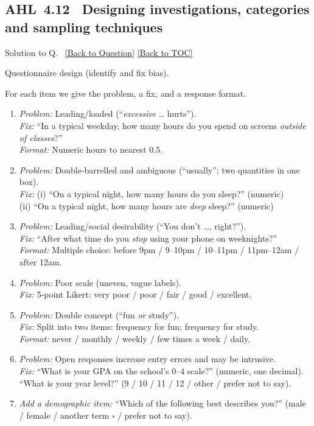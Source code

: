 \documentclass[11pt]{article}
\def\textbf#1{#1}%
\newcommand{\tocsubsection}[1]{\subsection{#1}}
\newcounter{question}
\newcounter{solutionNo} %
\newenvironment{solution}{
  \refstepcounter{solutionNo}%
  \hypertarget{sol-\thesolutionNo}{}%
  \par\noindent\textbf{Solution to Q\thesolutionNo.}~%
  \hyperlink{q-\thesolutionNo}{\small[Back to Question]}%
  \quad\hyperlink{toc}{\small[Back to TOC]}%
  \par\vspace{0.3em}%
}{\par}
\begin{document}

\tocsubsection{AHL 4.12 \; Designing investigations, categories and sampling techniques}


\begin{solution}
\textbf{Questionnaire design (identify and fix bias).}

For each item we give the problem, a fix, and a response format.

\begin{enumerate}
  \item \emph{Problem:} Leading/loaded (“\emph{excessive} … hurts”). \\
        \emph{Fix:} “In a typical weekday, how many hours do you spend on screens \emph{outside of classes}?” \\
        \emph{Format:} Numeric hours to nearest $0.5$.

  \item \emph{Problem:} Double‐barrelled and ambiguous (“usually”; two quantities in one box). \\
        \emph{Fix:} (i) “On a typical night, how many hours do you sleep?” (numeric) \\
        (ii) “On a typical night, how many hours are \emph{deep} sleep?” (numeric)

  \item \emph{Problem:} Leading/social desirability (“You don’t …, right?”). \\
        \emph{Fix:} “After what time do you \emph{stop} using your phone on weeknights?” \\
        \emph{Format:} Multiple choice: before 9pm / 9–10pm / 10–11pm / 11pm–12am / after 12am.

  \item \emph{Problem:} Poor scale (uneven, vague labels). \\
        \emph{Fix:} 5-point Likert: very poor / poor / fair / good / excellent.

  \item \emph{Problem:} Double concept (“fun \emph{or} study”). \\
        \emph{Fix:} Split into two items: frequency for fun; frequency for study. \\
        \emph{Format:} never / monthly / weekly / few times a week / daily.

  \item \emph{Problem:} Open responses increase entry errors and may be intrusive. \\
        \emph{Fix:} “What is your GPA on the school’s $0$–$4$ scale?” (numeric, one decimal).
        “What is your year level?” (9 / 10 / 11 / 12 / other / prefer not to say).

  \item \emph{Add a demographic item:} “Which of the following best describes you?” (male / female / another term $\square$ / prefer not to say).
\end{enumerate}
\end{solution}
\end{document}
